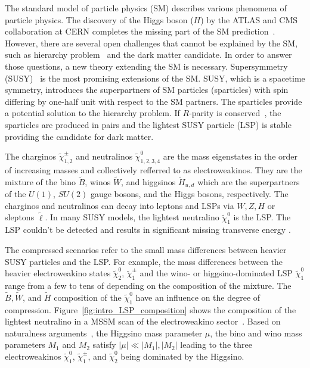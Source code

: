 The standard model of particle physics (SM) describes various phenomena of particle physics.
The discovery of the Higgs boson ($H$) by the ATLAS and CMS collaboration at CERN completes the missing part of the SM prediction~\cite{Aad:2012tfa, Chatrchyan:2012xdj}.
However, there are several open challenges that cannot be explained by the SM, such as hierarchy problem~\cite{Weinberg:1975gm, Gildener:1976ai, Susskind:1978ms} and the dark matter candidate.
In order to answer those questions, a new theory extending the SM is necessary.
Supersymmetry (SUSY)~\cite{Wess:1973kz, Wess:201649, Golfand:1971iw, Martin:1997ns} is the most promising extensions of the SM.
SUSY, which is a spacetime symmetry, introduces the superpartners of SM particles (sparticles) with spin differing by one-half unit with respect to the SM partners.
The sparticles provide a potential solution to the hierarchy problem.
If $R$-parity is conserved~\cite{Fayet:1976et, Fayet:1977yc, Farrar:1978xj}, the sparticles are produced in pairs and the lightest SUSY particle (LSP) is stable providing the candidate for dark matter.

The charginos $\tilde{\chi}^{\pm}_{1,2}$ and neutralinos $\tilde{\chi}^{0}_{1,2,3,4}$ are the mass eigenstates in the order of increasing masses and collectively refferred to as electroweakinos.
They are the mixture of the bino $\tilde{B}$, winos $\tilde{W}$, and higgsinos $\tilde{H}_{u,d}$ which are the superpartners of the $U(1)$, $SU(2)$ gauge bosons, and the Higgs bosons, respectively.
The charginos and neutralinos can decay into leptons and LSPs via $W, Z, H$ or sleptons $\tilde{\ell}$.
In many SUSY models, the lightest neutralino $\tilde{\chi}^{0}_{1}$ is the LSP.
The LSP couldn't be detected and results in significant missing transverse energy \MET.

The compressed scenarios refer to the small mass differences between heavier SUSY particles and the LSP.
For example, the mass differences between the heavier electroweakino states $\tilde{\chi}^{0}_{2}$, $\tilde{\chi}^{\pm}_{1}$ and the wino- or higgsino-dominated LSP $\tilde{\chi}^{0}_{1}$ range from a few {\MeV} to tens of {\GeV} depending on the composition of the mixture.
The $\tilde{B}, \tilde{W}$, and $\tilde{H}$ composition of the $\tilde{\chi}^{0}_{1}$ have an influence on the degree of compression.
Figure~\ref{fig:intro_LSP_composition} shows the composition of the lightest neutralino in a MSSM scan of the electroweakino sector~\cite{Aaboud:2016wna}.
Based on naturalness arguments~\cite{Barbieri:1987fn, deCarlos:1993rbr}, the Higgsino mass parameter $\mu$, the bino and wino mass parameters $M_{1}$ and $M_{2}$ satisfy $|\mu| \ll |M_{1}|, |M_{2}|$ leading to the three electroweakinos $\tilde{\chi}^{0}_{1}$, $\tilde{\chi}^{\pm}_{1}$, and $\tilde{\chi}^{0}_{2}$ being dominated by the Higgsino.

